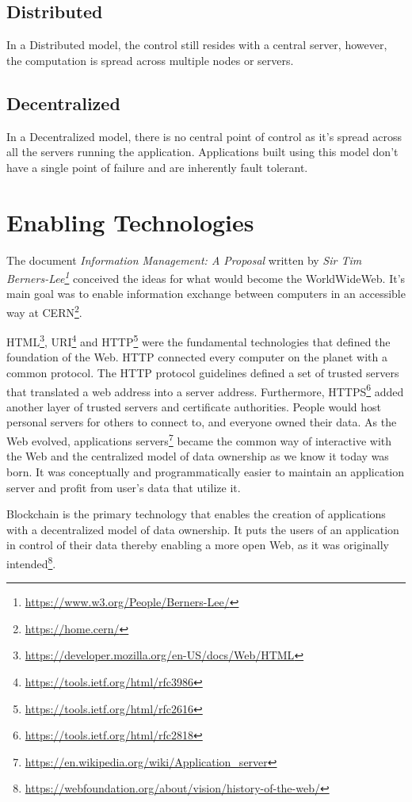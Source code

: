 	\subsection{Distributed}
	In a Distributed model, the control still resides with a central server, however, the computation is spread across multiple nodes or servers.
	
	\subsection{Decentralized}
	In a Decentralized model, there is no central point of control as it's spread across all the servers running the application. Applications built using this model don't have a single point of failure and are inherently fault tolerant.

\section{Enabling Technologies}
	The document \textit{Information Management: A Proposal\cite{berners1989information}} written by \textit{Sir Tim Berners-Lee\footnote{\url{https://www.w3.org/People/Berners-Lee/}}} conceived the ideas for what would become the WorldWideWeb. It's main goal was to enable information exchange between computers in an accessible way at CERN\footnote{\url{https://home.cern/}}.
	
	HTML\footnote{\url{https://developer.mozilla.org/en-US/docs/Web/HTML}}, URI\footnote{\url{https://tools.ietf.org/html/rfc3986}} and HTTP\footnote{\url{https://tools.ietf.org/html/rfc2616}} were the fundamental technologies that defined the foundation of the Web. HTTP connected every computer on the planet with a common protocol. The HTTP protocol guidelines defined a set of trusted servers that translated a web address into a server address. Furthermore, HTTPS\footnote{\url{https://tools.ietf.org/html/rfc2818}} added another layer of trusted servers and certificate authorities. People would host personal servers for others to connect to, and everyone owned their data\cite{raval2016decentralized}. As the Web evolved, applications servers\footnote{\url{https://en.wikipedia.org/wiki/Application_server}} became the common way of interactive with the Web and the centralized model of data ownership as we know it today was born\cite{raval2016decentralized}. It was conceptually and programmatically easier to maintain an application server and profit from user's data that utilize it.
	
	Blockchain is the primary technology that enables the creation of applications with a decentralized model of data ownership. It puts the users of an application in control of their data thereby enabling a more open Web, as it was originally intended\footnote{\url{https://webfoundation.org/about/vision/history-of-the-web/}}.
	

